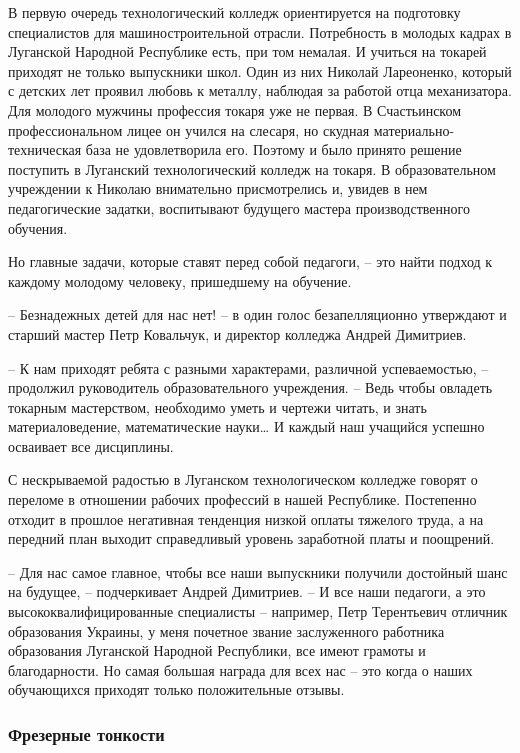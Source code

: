 В первую очередь технологический колледж ориентируется на подготовку
специалистов для машиностроительной отрасли. Потребность в молодых кадрах в
Луганской Народной Республике есть, при том немалая. И учиться на токарей
приходят не только выпускники школ. Один из них Николай Лареоненко, который с
детских лет проявил любовь к металлу, наблюдая за работой отца механизатора.
Для молодого мужчины профессия токаря уже не первая. В Счастьинском
профессиональном лицее он учился на слесаря, но скудная материально-техническая
база не удовлетворила его. Поэтому и было принято решение поступить в Луганский
технологический колледж на токаря. В образовательном учреждении к Николаю
внимательно присмотрелись и, увидев в нем педагогические задатки, воспитывают
будущего мастера производственного обучения. 

Но главные задачи, которые ставят перед собой педагоги, – это найти подход к каждому молодому человеку, пришедшему на обучение. 

– Безнадежных детей для нас нет! – в один голос безапелляционно утверждают и
старший мастер Петр Ковальчук, и директор колледжа Андрей Димитриев.

– К нам приходят ребята с разными характерами, различной успеваемостью, –
продолжил руководитель образовательного учреждения. – Ведь чтобы овладеть
токарным мастерством, необходимо уметь и чертежи читать, и знать
материаловедение, математические науки… И каждый наш учащийся успешно осваивает
все дисциплины.

С нескрываемой радостью в Луганском технологическом колледже говорят о переломе
в отношении рабочих профессий в нашей Республике. Постепенно отходит в прошлое
негативная тенденция низкой оплаты тяжелого труда, а на передний план выходит
справедливый уровень заработной платы и поощрений. 

– Для нас самое главное, чтобы все наши выпускники получили достойный шанс на
будущее, – подчеркивает Андрей Димитриев. – И все наши педагоги, а это
высококвалифицированные специалисты – например, Петр Терентьевич отличник
образования Украины, у меня почетное звание заслуженного работника образования
Луганской Народной Республики, все имеют грамоты и благодарности. Но самая
большая награда для всех нас – это когда о наших обучающихся приходят только
положительные отзывы.

\subsubsection{Фрезерные тонкости}

